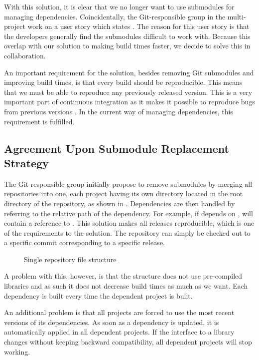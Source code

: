 With this solution, it is clear that we no longer want to use submodules for managing dependencies. Coincidentally, the Git-responsible group in the multi-project work on a user story which states . The reason for this user story is that the developers generally find the submodules difficult to work with. Because this overlap with our solution to making build times faster, we decide to solve this in collaboration.

An important requirement for the solution, besides removing Git submodules and improving build times, is that every build should be reproducible. This means that we must be able to reproduce any previously released version. This is a very important part of continuous integration as it makes it possible to reproduce bugs from previous versions \parencite{fowlerReproducibleBuild,humble2010}. In the current way of managing dependencies, this requirement is fulfilled.

\subsection{Agreement Upon Submodule Replacement Strategy}
The Git-responsible group initially propose to remove submodules by merging all repositories into one, each project having its own directory located in the root directory of the repository, as shown in . Dependencies are then handled by referring to the relative path of the dependency. For example, if  depends on ,  will contain a reference to . This solution makes all releases reproducible, which is one of the requirements to the solution. The repository can simply be checked out to a specific commit corresponding to a specific release.
\begin{figure}
\caption{Single repository file structure} \label{fig:single_repo_structure}
\end{figure}
A problem with this, however, is that the structure does not use pre-compiled libraries and as such it does not decrease build times as much as we want. Each dependency is built every time the dependent project is built.

An additional problem is that all projects are forced to use the most recent versions of its dependencies. As soon as a dependency is updated, it is automatically applied in all dependent projects. If the interface to a library changes without keeping backward compatibility, all dependent projects will stop working.

